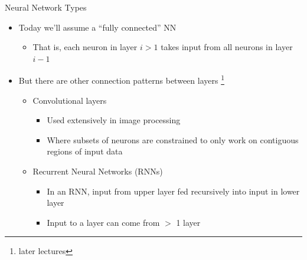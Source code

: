 \documentclass[aspectratio=169]{beamer}
\begin{document}
\begin{frame}{Neural Network Types}

\begin{itemize}
	\item Today we'll assume a ``fully connected'' NN
	\begin{itemize}
                \item That is, each neuron in layer $i > 1$ takes input from all neurons in layer $i-1$
	\end{itemize}	
	\item But there are other connection patterns between layers \footnote{later lectures}
	\begin{itemize}
		\item Convolutional layers
	\begin{itemize}
		\item Used extensively in image processing
		\item Where subsets of neurons are constrained to only work on contiguous regions of input data
	\end{itemize}
	\item Recurrent Neural Networks (RNNs)
	\begin{itemize}
		\item In an RNN, input from upper layer fed recursively into input in lower layer
		\item Input to a layer can come from $>$ 1 layer
	\end{itemize}
	\end{itemize}
\end{itemize}
\end{frame}
\end{document}
